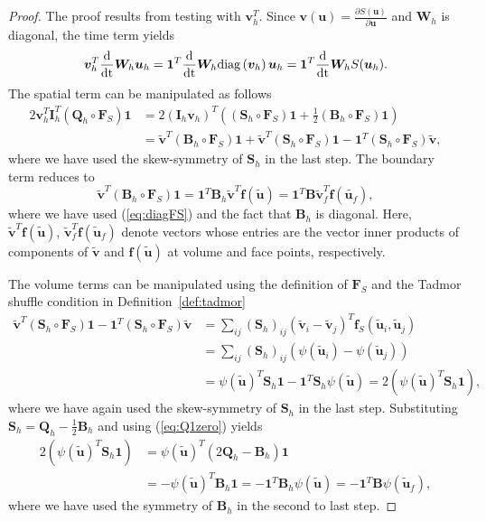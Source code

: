 \documentclass[onefignum,onetabnum,final]{siamart171218}
\renewcommand{\tilde}{\widetilde}
\newcommand{\td}[2]{\frac{{\rm d}#1}{{\rm d}{\rm #2}}}
\newcommand{\pd}[2]{\frac{\partial#1}{\partial#2}}
\newcommand{\LRp}[1]{\left( #1 \right)}
\newcommand{\diag}[1]{{\rm diag}\LRp{#1}}
\begin{document}
\begin{proof}
The proof results from testing with $\bm{v}_h^T$.  Since $\bm{v}(\bm{u}) = \pd{S(\bm{u})}{\bm{u}}$ and $\bm{W}_h$ is diagonal, the time term yields
\[
\bm{v}_h^T\td{}{t}\bm{W}_h\bm{u}_h = \bm{1}^T \td{}{t}\bm{W}_h\diag{\bm{v}_h}\bm{u}_h = \bm{1}^T\td{}{t}\bm{W}_h S(\bm{u}_h).
\]
The spatial term can be manipulated as follows
\begin{align*}
2\bm{v}_h^T \bm{I}_h^T\LRp{\bm{Q}_h \circ \bm{F}_S}\bm{1} &= 2\LRp{\bm{I}_h\bm{v}_h}^T \LRp{\LRp{\bm{S}_h \circ \bm{F}_S}\bm{1} + \frac{1}{2}\LRp{\bm{B}_h \circ \bm{F}_S}\bm{1}}\\
&= \tilde{\bm{v}}^T\LRp{\bm{B}_h \circ \bm{F}_S}\bm{1} + \tilde{\bm{v}}^T \LRp{\bm{S}_h \circ \bm{F}_S}\bm{1} - \bm{1}^T \LRp{\bm{S}_h \circ \bm{F}_S}\tilde{\bm{v}},
\end{align*}
where we have used the skew-symmetry of $\bm{S}_h$ in the last step.  The boundary term reduces to 
\[
\tilde{\bm{v}}^T\LRp{\bm{B}_h \circ \bm{F}_S}\bm{1} = \bm{1}^T\bm{B}_h\tilde{\bm{v}}^T\bm{f}\LRp{\tilde{\bm{u}}}= \bm{1}^T\bm{B}\tilde{\bm{v}}_f^T\bm{f}\LRp{\tilde{\bm{u}_f}},
\]
where we have used (\ref{eq:diagFS}) and the fact that $\bm{B}_h$ is diagonal.  Here, $\tilde{\bm{v}}^T\bm{f}\LRp{\tilde{\bm{u}}}$, $\tilde{\bm{v}}_f^T\bm{f}\LRp{\tilde{\bm{u}}_f}$ denote vectors whose entries are the vector inner products of components of $\tilde{\bm{v}}$ and $\bm{f}\LRp{\tilde{\bm{u}}}$ at volume and face points, respectively.  

The volume terms can be manipulated using the definition of $\bm{F}_S$ and the Tadmor shuffle condition in Definition~\ref{def:tadmor}
\begin{align*}
\tilde{\bm{v}}^T \LRp{\bm{S}_h \circ \bm{F}_S} \bm{1} - \bm{1}^T \LRp{\bm{S}_h \circ \bm{F}_S}\tilde{\bm{v}} 
&= \sum_{ij} \LRp{\bm{S}_h}_{ij} \LRp{\tilde{\bm{v}}_i - \tilde{\bm{v}}_j}^T\bm{f}_S\LRp{\tilde{\bm{u}}_i,\tilde{\bm{u}}_j}\\
&= \sum_{ij} \LRp{\bm{S}_h}_{ij} \LRp{\psi\LRp{\tilde{\bm{u}}_i} - \psi\LRp{\tilde{\bm{u}}_j}}\\
&= \psi\LRp{\tilde{\bm{u}}}^T \bm{S}_h \bm{1}- \bm{1}^T \bm{S}_h \psi\LRp{\tilde{\bm{u}}} = 2\LRp{ \psi\LRp{\tilde{\bm{u}}}^T\bm{S}_h\bm{1}},
\end{align*}
where we have again used the skew-symmetry of $\bm{S}_h$ in the last step.  Substituting $\bm{S}_h = \bm{Q}_h - \frac{1}{2}\bm{B}_h$ and using (\ref{eq:Q1zero}) yields
\begin{align*} 
2\LRp{ \psi\LRp{\tilde{\bm{u}}}^T\bm{S}_h\bm{1}} &= \psi\LRp{\tilde{\bm{u}}}^T\LRp{2\bm{Q}_h - \bm{B}_h} \bm{1} \\
&=-\psi\LRp{\tilde{\bm{u}}}^T\bm{B}_h \bm{1}  = -\bm{1}^T\bm{B}_h \psi\LRp{\tilde{\bm{u}}} =  -\bm{1}^T\bm{B} \psi\LRp{\tilde{\bm{u}}_f}, 
\end{align*} 
where we have used the symmetry of $\bm{B}_h$ in the second to last step.
\end{proof}
\end{document}
